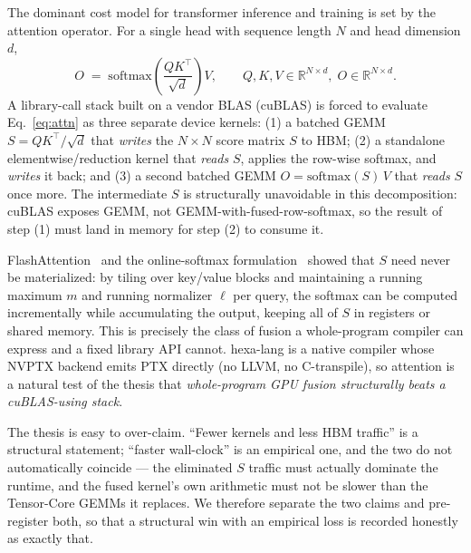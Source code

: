 \documentclass[11pt,a4paper]{article}
\begin{document}
The dominant cost model for transformer inference and training is set by the
attention operator. For a single head with sequence length $N$ and head
dimension $d$,
\begin{equation}
  O \;=\; \mathrm{softmax}\!\left(\frac{QK^\top}{\sqrt{d}}\right) V,
  \qquad Q,K,V \in \mathbb{R}^{N\times d},\; O\in\mathbb{R}^{N\times d}.
  \label{eq:attn}
\end{equation}
A library-call stack built on a vendor BLAS (cuBLAS) is forced to evaluate
Eq.~\eqref{eq:attn} as three separate device kernels: (1) a batched GEMM
$S = QK^\top/\sqrt{d}$ that \emph{writes} the $N\times N$ score matrix $S$ to
HBM; (2) a standalone elementwise/reduction kernel that \emph{reads} $S$,
applies the row-wise softmax, and \emph{writes} it back; and (3) a second
batched GEMM $O = \mathrm{softmax}(S)\,V$ that \emph{reads} $S$ once more. The
intermediate $S$ is structurally unavoidable in this decomposition: cuBLAS
exposes GEMM, not GEMM-with-fused-row-softmax, so the result of step (1) must
land in memory for step (2) to consume it.

FlashAttention~\citep{dao2022flashattention} and the online-softmax
formulation~\citep{milakov2018online} showed that $S$ need never be
materialized: by tiling over key/value blocks and maintaining a running maximum
$m$ and running normalizer $\ell$ per query, the softmax can be computed
incrementally while accumulating the output, keeping all of $S$ in registers or
shared memory. This is precisely the class of fusion a whole-program compiler
can express and a fixed library API cannot. hexa-lang is a native compiler whose
NVPTX backend emits PTX directly (no LLVM, no C-transpile), so attention is a
natural test of the thesis that \emph{whole-program GPU fusion structurally
beats a cuBLAS-using stack}.

The thesis is easy to over-claim. ``Fewer kernels and less HBM traffic'' is a
structural statement; ``faster wall-clock'' is an empirical one, and the two do
not automatically coincide --- the eliminated $S$ traffic must actually dominate
the runtime, and the fused kernel's own arithmetic must not be slower than the
Tensor-Core GEMMs it replaces. We therefore separate the two claims and
pre-register both, so that a structural win with an empirical loss is recorded
honestly as exactly that.
\end{document}
